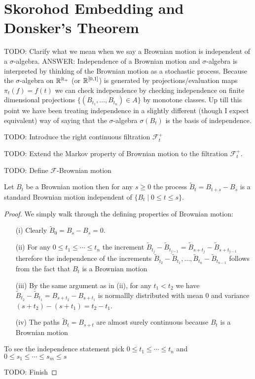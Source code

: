 \section{Skorohod Embedding and Donsker's Theorem}
TODO: Clarify what we mean when we say a Brownian motion is
independent of a $\sigma$-algebra.  ANSWER: Independence of a Brownian
motion and $\sigma$-algebra is interpreted by thinking of the Brownian
motion as a stochastic process.  Because the $\sigma$-algebra on
$\mathbb{R}^{\mathbb{R}_+}$ (or $\mathbb{R}^{[0,1]}$) is generated by
projections/evaluation maps $\pi_t(f) = f(t)$ we can check
independence by checking independence on finite dimensional
projections $\lbrace (B_{t_1}, \dotsc, B_{t_n}) \in A \rbrace$ by
monotone classes.  Up till this point we have been treating
independence in a slightly different (though I expect equivalent) way
of saying that the $\sigma$-algebra $\sigma(B_t)$ is the basis of independence.

TODO: Introduce the right continuous filtration $\mathcal{F}^+_t$

TODO: Extend the Markov property of Brownian motion to the filtration $\mathcal{F}^+_t$.

TODO: Define $\mathcal{F}$-Brownian motion

\begin{thm}\label{MarkovPropertyBrownianMotion}Let $B_t$ be a
  Brownian motion then for any $s \geq 0$ the process $\tilde{B}_t = B_{t + s} -
  B_s$ is a standard Brownian motion independent of $\lbrace B_t \mid
  0 \leq t \leq s \rbrace$.
\end{thm}
\begin{proof}
We simply walk through the defining properties of Brownian motion:
\begin{itemize}
\item[(i)] Clearly $\tilde{B}_0 = B_s - B_s = 0$.
\item[(ii)] For any $0 \leq t_1 \leq \cdots \leq t_n$ the increment
  $\tilde{B}_{t_j} - \tilde{B}_{t_{j-1}} = \tilde{B}_{s+ t_j} - \tilde{B}_{s+ t_{j-1}}$
  therefore the independence of the increments $\tilde{B}_{t_2} -
  \tilde{B}_{t_1}, \dotsc, \tilde{B}_{t_n} - \tilde{B}_{t_{n-1}}$ follows from the fact
  that $B_t$ is a Brownian motion
\item[(iii)]By the same argument as in (ii), for any $t_1 < t_2$ we
  have $\tilde{B}_{t_2} -  \tilde{B}_{t_1} = B_{s+t_2} -  B_{s+t_1}$ is normallly
  distributed with mean $0$ and variance $(s + t_2) - (s+t_1) = t_2 -
  t_1$.
\item[(iv)]The paths $\tilde{B}_t = B_{s+t}$ are almost surely continuous
  because $B_t$ is a Brownian motion
\end{itemize}

To see the independence statement pick $0 \leq t_1 \leq \cdots \leq
t_n$ and $0 \leq s_1 \leq \cdots \leq s_m \leq s$ 

TODO: Finish
\end{proof}

